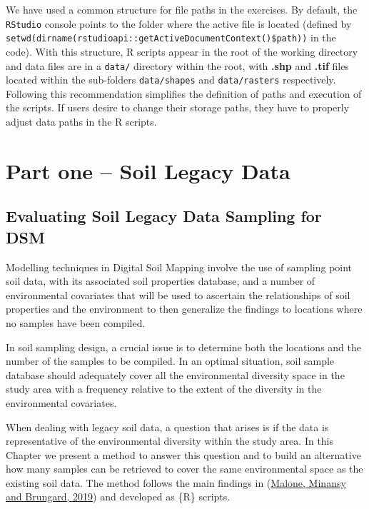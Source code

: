 \documentclass[
  10pt,
  b5paper,
  oneside]{book}
\begin{document}
We have used a common structure for file paths in the exercises. By default, the \texttt{\textquotesingle{}RStudio\textquotesingle{}} console points to the folder where the active file is located (defined by \texttt{setwd(dirname(rstudioapi::getActiveDocumentContext()\$path))} in the code). With this structure, R scripts appear in the root of the working directory and data files are in a \texttt{\textquotesingle{}data/\textquotesingle{}} directory within the root, with \textbf{.shp} and \textbf{.tif} files located within the sub-folders \texttt{\textquotesingle{}data/shapes\textquotesingle{}} and \texttt{\textquotesingle{}data/rasters\textquotesingle{}} respectively. Following this recommendation simplifies the definition of paths and execution of the scripts. If users desire to change their storage paths, they have to properly adjust data paths in the R scripts.

\hypertarget{part-part-one-soil-legacy-data}{%
\part*{Part one -- Soil Legacy Data}\label{part-part-one-soil-legacy-data}}

\hypertarget{legacy_data}{%
\chapter{Evaluating Soil Legacy Data Sampling for DSM}\label{legacy_data}}

Modelling techniques in Digital Soil Mapping involve the use of sampling point soil data, with its associated soil properties database, and a number of environmental covariates that will be used to ascertain the relationships of soil properties and the environment to then generalize the findings to locations where no samples have been compiled.

In soil sampling design, a crucial issue is to determine both the locations and the number of the samples to be compiled. In an optimal situation, soil sample database should adequately cover all the environmental diversity space in the study area with a frequency relative to the extent of the diversity in the environmental covariates.

When dealing with legacy soil data, a question that arises is if the data is representative of the environmental diversity within the study area. In this Chapter we present a method to answer this question and to build an alternative how many samples can be retrieved to cover the same environmental space as the existing soil data. The method follows the main findings in (\protect\hyperlink{ref-Malone}{Malone, Minansy and Brungard, 2019}) and developed as \{R\} scripts.
\end{document}
